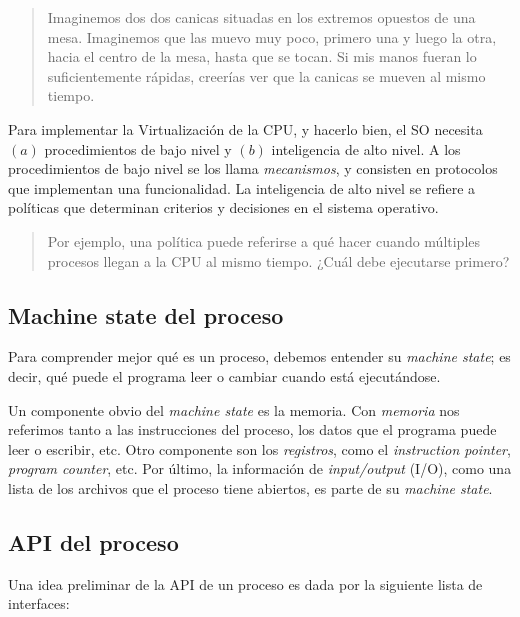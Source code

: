 \documentclass[a4paper, 12pt]{article}
\begin{document}
\begin{quote}
    Imaginemos dos dos canicas situadas en los extremos opuestos de una mesa.
    Imaginemos que las muevo muy poco, primero una y luego la otra, hacia el
    centro de la mesa, hasta que se tocan. Si mis manos fueran lo
    suficientemente rápidas, creerías ver que la canicas se mueven al mismo
    tiempo.
\end{quote}


Para implementar la Virtualización de la CPU, y hacerlo bien, el SO necesita 
$(a)$ procedimientos de bajo nivel y $(b)$ inteligencia de alto nivel. A los 
procedimientos de bajo nivel se los llama \textit{mecanismos}, y consisten 
en protocolos que implementan una funcionalidad. La inteligencia de 
alto nivel se refiere a políticas que determinan criterios y decisiones 
en el sistema operativo.

\begin{quote}
    Por ejemplo, una política puede referirse a qué hacer cuando múltiples procesos 
    llegan a la CPU al mismo tiempo. ¿Cuál debe ejecutarse primero?
\end{quote}

\subsection{Machine state del proceso}

Para comprender mejor qué es un proceso, debemos entender su \textit{machine
state}; es decir, qué puede el programa leer o cambiar cuando está
ejecutándose.

Un componente obvio del \textit{machine state} es la memoria. Con
\textit{memoria} nos referimos tanto a las instrucciones del proceso, los datos
que el programa puede leer o escribir, etc. Otro componente son los
\textit{registros}, como el \textit{instruction pointer}, \textit{program
counter}, etc. Por último, la información de \textit{input/output} (I/O), como
una lista de los archivos que el proceso tiene abiertos, es parte de su
\textit{machine state}.

\subsection{API del proceso}

Una idea preliminar de la API de un proceso es dada por la siguiente 
lista de interfaces:
\end{document}

